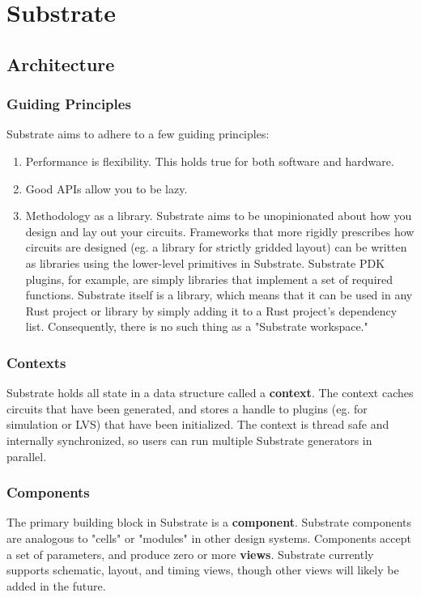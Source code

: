 \chapter{Substrate}

\section{Architecture}
\subsection{Guiding Principles}

Substrate aims to adhere to a few guiding principles:
\begin{enumerate}
\item Performance is flexibility. This holds true for both software and hardware.
\item Good APIs allow you to be lazy.
\item Methodology as a library. Substrate aims to be unopinionated about how you design and lay out your circuits.
  Frameworks that more rigidly prescribes how circuits are designed (eg. a library for strictly gridded layout)
  can be written as libraries using the lower-level primitives in Substrate.
  Substrate PDK plugins, for example, are simply libraries that implement a set of required functions.
  Substrate itself is a library, which means that it can be used in any Rust project or library by simply adding it to a Rust project's dependency list. Consequently, there is no such thing as a "Substrate workspace."
\end{enumerate}

\subsection{Contexts}

Substrate holds all state in a data structure called a \textbf{context}.
The context caches circuits that have been generated, and stores a handle to plugins (eg. for simulation or LVS) that have been initialized.
The context is thread safe and internally synchronized, so users can run multiple Substrate generators in parallel.

\subsection{Components}

The primary building block in Substrate is a \textbf{component}.
Substrate components are analogous to "cells" or "modules" in other design systems.
Components accept a set of parameters, and produce zero or more \textbf{views}.
Substrate currently supports schematic, layout, and timing views,
though other views will likely be added in the future.

